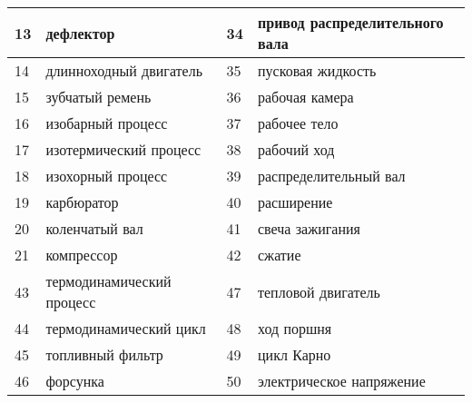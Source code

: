 \begin{longtable}{|p{0.5cm}|p{7cm}|p{0.5cm}|p{7cm}|}
	13 & дефлектор & 34 & привод распределительного вала \\ 
	\hline
	
	14 & длинноходный двигатель & 35 & пусковая жидкость \\
	\hline
	
	15 & зубчатый ремень & 36 & рабочая камера \\ 
	\hline
	
	16 & изобарный процесс & 37 & рабочее тело \\
	\hline
	
	17 & изотермический процесс & 38 & рабочий ход \\
	\hline
	
	18 & изохорный процесс & 39 & распределительный вал \\
	\hline
	
	19 & карбюратор & 40 & расширение \\
	\hline
	
	20 & коленчатый вал & 41 & свеча зажигания \\
	\hline
	
	21 & компрессор & 42 & сжатие\\
	
	43 & термодинамический процесс & 47 & тепловой двигатель \\
	\hline
	
	44 & термодинамический цикл & 48 & ход поршня\\
	\hline
	
	45 & топливный фильтр  & 49 & цикл Карно \\
	\hline
	
	46 & форсунка & 50 & электрическое напряжение\\
\end{longtable}
